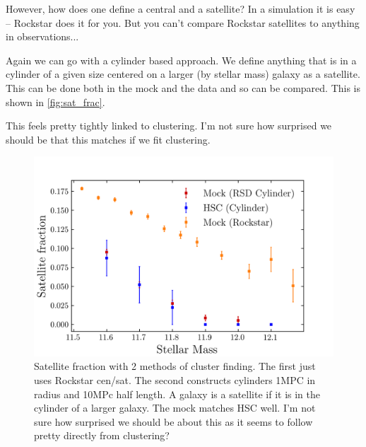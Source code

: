 \documentclass{article}
\begin{document}
However, how does one define a central and a satellite? In a simulation it is easy -- Rockstar does it for you. But you can't compare Rockstar satellites to anything in observations...

Again we can go with a cylinder based approach. We define anything that is in a cylinder of a given size centered on a larger (by stellar mass) galaxy as a satellite. This can be done both in the mock and the data and so can be compared. This is shown in \autoref{fig:sat_frac}.

This feels pretty tightly linked to clustering. I'm not sure how surprised we should be that this matches if we fit clustering.


\begin{figure}[h]
    \includegraphics[width=\textwidth]{images/sat_frac.png}
    \caption{Satellite fraction with 2 methods of cluster finding. The first just uses Rockstar cen/sat. The second constructs cylinders 1MPC in radius and 10MPc half length. A galaxy is a satellite if it is in the cylinder of a larger galaxy. The mock matches HSC well.
        I'm not sure how surprised we should be about this as it seems to follow pretty directly from clustering?
    \label{fig:sat_frac}
}
\end{figure}
\end{document}
